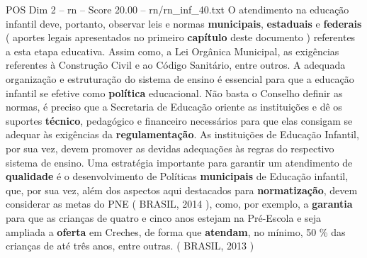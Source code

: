 \begin{textsample}{POS Dim 2 – rn – Score 20.00 – rn/rn\_inf\_40.txt}
O atendimento na educação infantil deve, portanto, observar leis e normas \textbf{municipais}, \textbf{estaduais} e \textbf{federais} ( aportes legais apresentados no primeiro \textbf{capítulo} deste documento ) referentes a esta etapa educativa.
Assim como, a Lei Orgânica Municipal, as exigências referentes à Construção Civil e ao Código Sanitário, entre outros.
A adequada organização e estruturação do sistema de ensino é essencial para que a educação infantil se efetive como \textbf{política} educacional.
Não basta o Conselho definir as normas, é preciso que a Secretaria de Educação oriente as instituições e dê os suportes \textbf{técnico}, pedagógico e financeiro necessários para que elas consigam se adequar às exigências da \textbf{regulamentação}.
As instituições de Educação Infantil, por sua vez, devem promover as devidas adequações às regras do respectivo sistema de ensino.
Uma estratégia importante para garantir um atendimento de \textbf{qualidade} é o desenvolvimento de Políticas \textbf{municipais} de Educação infantil, que, por sua vez, além dos aspectos aqui destacados para \textbf{normatização}, devem considerar as metas do PNE ( BRASIL, 2014 ), como, por exemplo, a \textbf{garantia} para que as crianças de quatro e cinco anos estejam na Pré-Escola e seja ampliada a \textbf{oferta} em Creches, de forma que \textbf{atendam}, no mínimo, 50 \% das crianças de até três anos, entre outras. ( BRASIL, 2013 )

\end{textsample}

